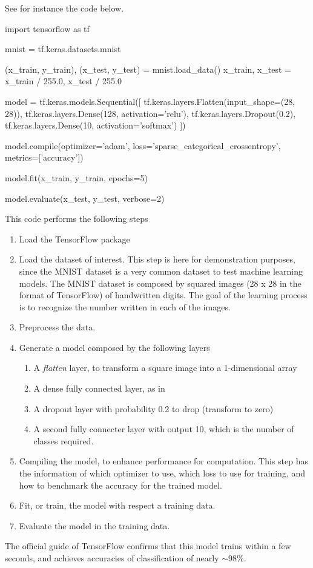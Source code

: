 \documentclass[]{report}
\begin{document}
See for instance the code below.
\vskip5mm

\begin{boxedverbatim}
import tensorflow as tf

mnist = tf.keras.datasets.mnist

(x_train, y_train), (x_test, y_test) = mnist.load_data()
x_train, x_test = x_train / 255.0, x_test / 255.0

model = tf.keras.models.Sequential([
  tf.keras.layers.Flatten(input_shape=(28, 28)),
  tf.keras.layers.Dense(128, activation='relu'),
  tf.keras.layers.Dropout(0.2),
  tf.keras.layers.Dense(10, activation='softmax')
])

model.compile(optimizer='adam',
              loss='sparse_categorical_crossentropy',
              metrics=['accuracy'])

model.fit(x_train, y_train, epochs=5)

model.evaluate(x_test,  y_test, verbose=2)

\end{boxedverbatim}
\vskip5mm

This code performs the following steps
\begin{enumerate}
\item Load the TensorFlow package
\item Load the dataset of interest. This step is here for demonstration purposes, since the MNIST dataset is a very common dataset to test machine learning models. The MNIST dataset is composed by squared images (28 x 28 in the format of TensorFlow) of handwritten digits. The goal of the learning process is to recognize the number written in each of the images. 
\item Preprocess the data.
\item Generate a model composed by the following layers 
\begin{enumerate}
\item A \textit{flatten} layer, to transform a square image into a 1-dimensional array
\item A dense fully connected layer, as in 
\item A dropout layer with probability 0.2 to drop (transform to zero)
\item A second fully connecter layer with output 10, which is the number of classes required.
\end{enumerate}
\item Compiling the model, to enhance performance for computation. This step has the information of which optimizer to use, which loss to use for training, and how to benchmark the accuracy for the trained model. 
\item Fit, or train, the model with respect a training data. 
\item Evaluate the model in the training data. 
\end{enumerate}
The official guide of TensorFlow confirms that this model trains within a few seconds, and achieves accuracies of classification of nearly $\sim 98 \%$. 
\end{document}

